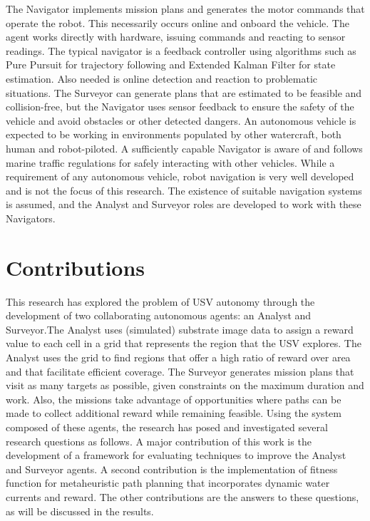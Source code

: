 \documentclass{tamuccthesis}
\begin{document}
The Navigator implements mission plans and generates the motor commands that operate the robot. This necessarily occurs online and onboard the vehicle. The agent works directly with hardware, issuing commands and reacting to sensor readings. The typical navigator is a feedback controller using algorithms such as Pure Pursuit for trajectory following and Extended Kalman Filter for state estimation. Also needed is online detection and reaction to problematic situations. The Surveyor can generate plans that are estimated to be feasible and collision-free, but the Navigator uses sensor feedback to ensure the safety of the vehicle and avoid obstacles or other detected dangers. An autonomous vehicle is expected to be working in environments populated by other watercraft, both human and robot-piloted. A sufficiently capable Navigator is aware of and follows marine traffic regulations for safely interacting with other vehicles. While a requirement of any autonomous vehicle, robot navigation is very well developed and is not the focus of this research. The existence of suitable navigation systems is assumed, and the Analyst and Surveyor roles are developed to work with these Navigators. 

\section{Contributions}
\label{section:contributions}

This research has explored the problem of USV autonomy through the development of two collaborating autonomous agents: an Analyst and Surveyor.The Analyst uses (simulated) substrate image data to assign a reward value to each cell in a grid that represents the region that the USV explores. The Analyst uses the grid to find regions that offer a high ratio of reward over area and that facilitate efficient coverage. The Surveyor generates mission plans that visit as many targets as possible, given constraints on the maximum duration and work. Also, the missions take advantage of opportunities where paths can be made to collect additional reward while remaining feasible. Using the system composed of these agents, the research has posed and investigated several research questions as follows. A major contribution of this work is the development of a framework for evaluating techniques to improve the Analyst and Surveyor agents. A second contribution is the implementation of fitness function for metaheuristic path planning that incorporates dynamic water currents and reward. The other contributions are the answers to these questions, as will be discussed in the results. 
\end{document}
